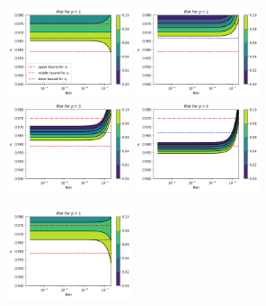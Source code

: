 \documentclass[twocolumn,           %
               showpacs,            %
               preprintnumbers,     %
               aps,                 %
               prl,          	    %
               letterpaper,             %
               superscriptaddress,      %
               nofootinbib,         %
               tightenlines,        %
               floats,floatfix      %
               ,usenatbib,
               ]{revtex4-1}
\begin{document}
\begin{figure}[h]
\centering
\begin{subfigure}[b]{\textwidth}
\includegraphics[width=0.4\textwidth]{p150.png}
\includegraphics[width=0.4\textwidth]{p250.png}\\
\includegraphics[width=0.4\textwidth]{p350.png}
\includegraphics[width=0.4\textwidth]{p450.png}
\label{curv50}
\end{subfigure}
\caption{Inflationary constraints in the $M/H$ vs $n_s$ plane for $N=50$ e-folds. We plotted contour regions for $0<r<0.1$.}
\begin{subfigure}[b]{\textwidth}\centering
\includegraphics[width=0.4\textwidth]{p160.png}

\end{subfigure}
\end{figure}
\end{document}
